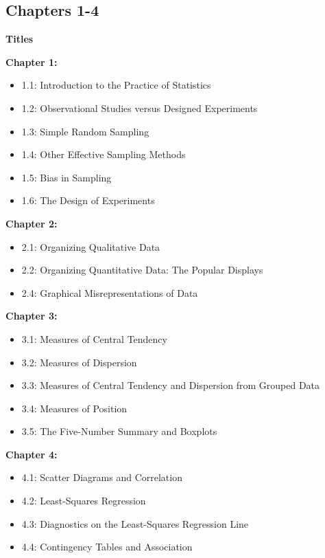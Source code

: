 \documentclass{report}
\begin{document}
      \subsection{Chapters 1-4}
      \bigbreak \noindent 
      \begin{large}
        \textbf{Titles}
      \end{large}
      \bigbreak \noindent 
      \textbf{Chapter 1:}
        \begin{itemize}
          \item 1.1: Introduction to the Practice of Statistics
          \item 1.2: Observational Studies versus Designed Experiments
          \item 1.3: Simple Random Sampling
          \item 1.4: Other Effective Sampling Methods
          \item 1.5: Bias in Sampling
          \item 1.6: The Design of Experiments
        \end{itemize}
      \textbf{Chapter 2:}
        \begin{itemize}
          \item 2.1: Organizing Qualitative Data
          \item 2.2: Organizing Quantitative Data: The Popular Displays
          \item 2.4: Graphical Misrepresentations of Data
        \end{itemize}
      \textbf{Chapter 3:}
        \begin{itemize}
          \item 3.1: Measures of Central Tendency
          \item 3.2: Measures of Dispersion
          \item 3.3: Measures of Central Tendency and Dispersion from Grouped Data
          \item 3.4: Measures of Position
          \item 3.5: The Five-Number Summary and Boxplots
        \end{itemize}
      \textbf{Chapter 4:}
        \begin{itemize}
          \item 4.1: Scatter Diagrams and Correlation
          \item 4.2: Least-Squares Regression
          \item 4.3: Diagnostics on the Least-Squares Regression Line
          \item 4.4: Contingency Tables and Association
        \end{itemize}
\end{document}
